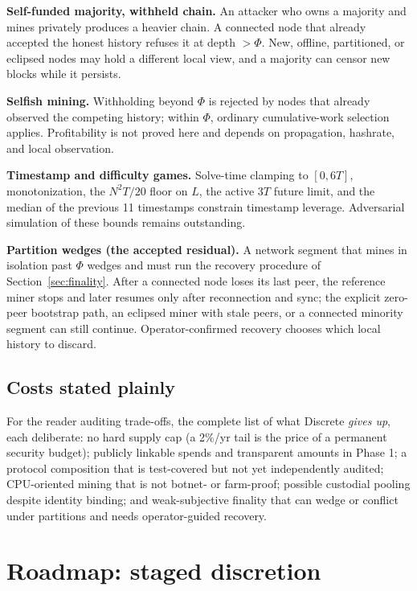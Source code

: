 \documentclass[11pt,a4paper]{article}
\begin{document}
\textbf{Self-funded majority, withheld chain.} An attacker who owns a
majority and mines privately produces a heavier chain. A connected node that
already accepted the honest history refuses it at depth $> \Phi$. New,
offline, partitioned, or eclipsed nodes may hold a different local view, and a
majority can censor new blocks while it persists.

\textbf{Selfish mining.} Withholding beyond $\Phi$ is rejected by nodes that
already observed the competing history; within $\Phi$, ordinary cumulative-work
selection applies. Profitability is not proved here and depends on propagation,
hashrate, and local observation.

\textbf{Timestamp and difficulty games.} Solve-time clamping to $[0, 6T]$,
monotonization, the $N^2T/20$ floor on $L$, the active $3T$ future limit, and
the median of the previous 11 timestamps constrain timestamp leverage.
Adversarial simulation of these bounds remains outstanding.

\textbf{Partition wedges (the accepted residual).} A network segment that
mines in isolation past $\Phi$ wedges and must run the recovery procedure of
Section~\ref{sec:finality}. After a connected node loses its last peer, the
reference miner stops and later resumes only after reconnection and sync; the
explicit zero-peer bootstrap path, an eclipsed miner with stale peers, or a
connected minority segment can still continue.
Operator-confirmed recovery chooses which local history to discard.

\subsection{Costs stated plainly}

For the reader auditing trade-offs, the complete list of what Discrete
\emph{gives up}, each deliberate: no hard supply cap (a 2\%/yr tail is the
price of a permanent security budget); publicly linkable spends and
transparent amounts in Phase 1; a protocol composition that is test-covered
but not yet independently audited; CPU-oriented mining that is not botnet- or
farm-proof; possible custodial pooling despite identity binding; and
weak-subjective finality that can wedge or conflict under partitions and needs
operator-guided recovery.

\section{Roadmap: staged discretion}\label{sec:roadmap}
\end{document}
